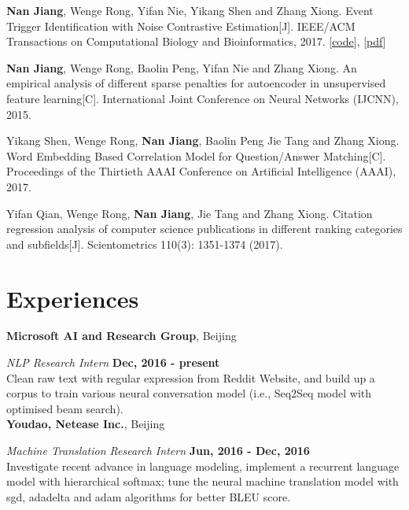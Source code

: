 \documentclass[margin,line]{resume}
\begin{document}
\begin{resume}
\textbf{Nan Jiang}, Wenge Rong, Yifan Nie, Yikang Shen and Zhang Xiong. Event Trigger Identification with Noise Contrastive Estimation[J]. IEEE/ACM Transactions on Computational Biology and Bioinformatics, 2017. [\href{https://github.com/jiangnanHugo/mlee-nce}{code}], [\href{https://github.com/jiangnanhugo/paper/blob/master/APBC2017/APBC2017.pdf}{pdf}]


\textbf{Nan Jiang}, Wenge Rong, Baolin Peng, Yifan Nie and Zhang Xiong. An empirical analysis of different sparse penalties for autoencoder in unsupervised feature learning[C]. International Joint Conference on Neural Networks (IJCNN), 2015.

Yikang Shen, Wenge Rong, \textbf{Nan Jiang}, Baolin Peng Jie Tang and Zhang Xiong. Word Embedding Based Correlation Model for Question/Answer Matching[C]. Proceedings of the Thirtieth {AAAI} Conference on Artificial Intelligence (AAAI), 2017.

Yifan Qian, Wenge Rong, \textbf{Nan Jiang}, Jie Tang and Zhang Xiong. Citation regression analysis of computer science publications in different ranking categories and subfields[J]. Scientometrics 110(3): 1351-1374 (2017).



\section{Experiences}
{\bf Microsoft AI and Research Group}, Beijing

{\em NLP Research Intern} \hfill {\bf Dec, 2016 - present}\\
Clean raw text with regular expression from Reddit Website, and build up a corpus to train various neural conversation model (i.e., Seq2Seq model with optimised beam search).\\


{\bf Youdao, Netease Inc.}, Beijing

{\em Machine Translation Research Intern} \hfill {\bf Jun, 2016 - Dec, 2016}\\
Investigate recent advance in language modeling, implement a recurrent language model with hierarchical softmax; tune the neural machine translation model with sgd, adadelta and adam algorithms for better BLEU score.\\



\end{resume}
\end{document}
